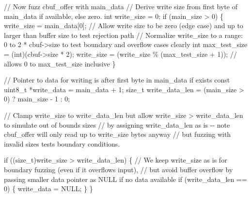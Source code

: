 \documentclass[
  a4paper,
]{scrreprt}
\newenvironment{Shaded}{\begin{snugshade}}{\end{snugshade}}
\newcommand{\CommentTok}[1]{\textcolor[rgb]{0.41,0.41,0.41}{#1}}
\newcommand{\ControlFlowTok}[1]{\textcolor[rgb]{0.85,0.12,0.09}{#1}}
\newcommand{\DataTypeTok}[1]{\textcolor[rgb]{0.47,0.16,0.63}{#1}}
\newcommand{\DecValTok}[1]{\textcolor[rgb]{0.47,0.16,0.63}{#1}}
\newcommand{\NormalTok}[1]{\textcolor[rgb]{0.33,0.33,0.33}{#1}}
\newcommand{\OperatorTok}[1]{\textcolor[rgb]{0.00,0.46,0.62}{#1}}
\theoremstyle{definition}
\theoremstyle{remark}
\begin{document}
\begin{Shaded}
\begin{Highlighting}[numbers=left,,]
    \CommentTok{// Now fuzz cbuf\_offer with main\_data}
    \CommentTok{// Derive write size from first byte of main\_data if available, else zero.}
    \DataTypeTok{int}\NormalTok{ write\_size }\OperatorTok{=} \DecValTok{0}\OperatorTok{;}
    \ControlFlowTok{if} \OperatorTok{(}\NormalTok{main\_size }\OperatorTok{\textgreater{}} \DecValTok{0}\OperatorTok{)} \OperatorTok{\{}
\NormalTok{        write\_size }\OperatorTok{=}\NormalTok{ main\_data}\OperatorTok{[}\DecValTok{0}\OperatorTok{];}
        \CommentTok{// Allow write size to be zero (edge case) and up to larger than buffer size to test rejection path}
        \CommentTok{// Normalize write\_size to a range: 0 to 2 * cbuf{-}\textgreater{}size to test boundary and overflow cases clearly}
        \DataTypeTok{int}\NormalTok{ max\_test\_size }\OperatorTok{=} \OperatorTok{(}\DataTypeTok{int}\OperatorTok{)(}\NormalTok{cbuf}\OperatorTok{{-}\textgreater{}}\NormalTok{size }\OperatorTok{*} \DecValTok{2}\OperatorTok{);}
\NormalTok{        write\_size }\OperatorTok{=} \OperatorTok{(}\NormalTok{write\_size }\OperatorTok{\%} \OperatorTok{(}\NormalTok{max\_test\_size }\OperatorTok{+} \DecValTok{1}\OperatorTok{));} \CommentTok{// allows 0 to max\_test\_size inclusive}
    \OperatorTok{\}}

    \CommentTok{// Pointer to data for writing is after first byte in main\_data if exists}
    \DataTypeTok{const} \DataTypeTok{uint8\_t} \OperatorTok{*}\NormalTok{write\_data }\OperatorTok{=}\NormalTok{ main\_data }\OperatorTok{+} \DecValTok{1}\OperatorTok{;}
    \DataTypeTok{size\_t}\NormalTok{ write\_data\_len }\OperatorTok{=} \OperatorTok{(}\NormalTok{main\_size }\OperatorTok{\textgreater{}} \DecValTok{0}\OperatorTok{)} \OperatorTok{?}\NormalTok{ main\_size }\OperatorTok{{-}} \DecValTok{1} \OperatorTok{:} \DecValTok{0}\OperatorTok{;}

    \CommentTok{// Clamp write\_size to write\_data\_len but allow write\_size \textgreater{} write\_data\_len to simulate out of bounds sizes}
    \CommentTok{// by assigning write\_data\_len as is {-}{-} note cbuf\_offer will only read up to write\_size bytes anyway}
    \CommentTok{// but fuzzing with invalid sizes tests boundary conditions.}

    \ControlFlowTok{if} \OperatorTok{((}\DataTypeTok{size\_t}\OperatorTok{)}\NormalTok{write\_size }\OperatorTok{\textgreater{}}\NormalTok{ write\_data\_len}\OperatorTok{)} \OperatorTok{\{}
        \CommentTok{// We keep write\_size as is for boundary fuzzing (even if it overflows input),}
        \CommentTok{// but avoid buffer overflow by passing smaller data pointer as NULL if no data available}
        \ControlFlowTok{if} \OperatorTok{(}\NormalTok{write\_data\_len }\OperatorTok{==} \DecValTok{0}\OperatorTok{)} \OperatorTok{\{}
\NormalTok{            write\_data }\OperatorTok{=}\NormalTok{ NULL}\OperatorTok{;}
        \OperatorTok{\}}
    \OperatorTok{\}}


\end{Highlighting}
\end{Shaded}
\end{document}
